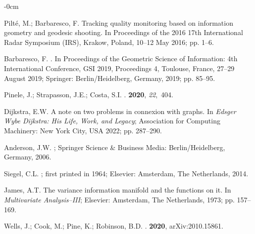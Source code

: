\documentclass[entropy,article,accept,oneauthor,pdftex,entropy]{Definitions/mdpi}
\begin{document}
\begin{adjustwidth}{-\extralength}{0cm}
\begin{thebibliography}{999}
Pilt{\'e}, M.; Barbaresco, F.
\newblock Tracking quality monitoring based on information geometry and
  geodesic shooting.
\newblock In Proceedings of the 2016 17th International Radar Symposium (IRS), {Krakow, Poland, 10--12 May 2016;} pp. 1--6.

Barbaresco, F.
.
\newblock In Proceedings of the Geometric Science of Information: 4th
  International Conference, GSI 2019, Proceedings 4, Toulouse, France, 27--29 August 2019;
  Springer: {Berlin/Heidelberg, Germany,} %
  2019; pp. 85--95.

Pinele, J.; Strapasson, J.E.; Costa, S.I.
.
 {\bf 2020}, {\em 22},~404.

Dijkstra, E.W.
\newblock A note on two problems in connexion with graphs. In {\em {Edsger Wybe
  Dijkstra: His Life, Work, and Legacy}}; {Association for Computing Machinery: New York City, USA} %
  2022; pp. 287--290.

Anderson, J.W.
; Springer Science \& Business Media: {Berlin/Heidelberg, Germany,} %
   2006.

Siegel, C.L.
; first printed in 1964; Elsevier: {Amsterdam, The Netherlands,} %
  2014.


James, A.T.
\newblock The variance information manifold and the functions on it. In {\em
  Multivariate Analysis--III}; Elsevier: {Amsterdam, The Netherlands,} %
   1973; pp. 157--169.

Wells, J.; Cook, M.; Pine, K.; Robinson, B.D.
.
 {\bf 2020}, arXiv:2010.15861.


\end{thebibliography}
\end{adjustwidth}
\end{document}
